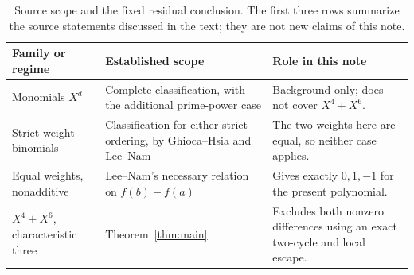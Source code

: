 \begin{table}[tb]
\centering
\small
\begin{tabular}{@{}p{}p{}p{}@{}}
\toprule
Family or regime & Established scope & Role in this note\\
\midrule
Monomials $X^d$ &
Complete classification, with the additional prime-power case &
Background only; does not cover $X^4+X^6$.\\[2pt]
Strict-weight binomials &
Classification for either strict ordering, by Ghioca--Hsia and Lee--Nam &
The two weights here are equal, so neither case applies.\\[2pt]
Equal weights, nonadditive &
Lee--Nam's necessary relation on $f(b)-f(a)$ &
Gives exactly $0,1,-1$ for the present polynomial.\\[2pt]
$X^4+X^6$, characteristic three &
Theorem~\ref{thm:main} &
Excludes both nonzero differences using an exact two-cycle and local escape.\\
\bottomrule
\end{tabular}
\caption{Source scope and the fixed residual conclusion. The first three
rows summarize the source statements discussed in the text; they are not
new claims of this note.}
\label{tab:scope}
\end{table}
